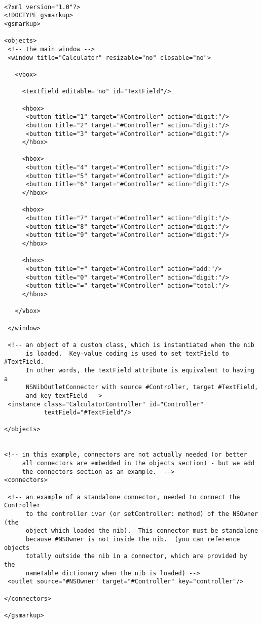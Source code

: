 \begin{verbatim}

<?xml version="1.0"?>
<!DOCTYPE gsmarkup>
<gsmarkup>

<objects>
 <!-- the main window -->
 <window title="Calculator" resizable="no" closable="no">

   <vbox>

     <textfield editable="no" id="TextField"/>

     <hbox>
      <button title="1" target="#Controller" action="digit:"/>
      <button title="2" target="#Controller" action="digit:"/>
      <button title="3" target="#Controller" action="digit:"/>
     </hbox>

     <hbox>
      <button title="4" target="#Controller" action="digit:"/>
      <button title="5" target="#Controller" action="digit:"/>
      <button title="6" target="#Controller" action="digit:"/>
     </hbox>

     <hbox>
      <button title="7" target="#Controller" action="digit:"/>
      <button title="8" target="#Controller" action="digit:"/>
      <button title="9" target="#Controller" action="digit:"/>
     </hbox>

     <hbox>
      <button title="+" target="#Controller" action="add:"/>
      <button title="0" target="#Controller" action="digit:"/>
      <button title="=" target="#Controller" action="total:"/>
     </hbox>

   </vbox>

 </window>

 <!-- an object of a custom class, which is instantiated when the nib
      is loaded.  Key-value coding is used to set textField to #TextField.
      In other words, the textField attribute is equivalent to having a
      NSNibOutletConnector with source #Controller, target #TextField, 
      and key textField -->
 <instance class="CalculatorController" id="Controller" 
           textField="#TextField"/>

</objects>


<!-- in this example, connectors are not actually needed (or better
     all connectors are embedded in the objects section) - but we add
     the connectors section as an example.  -->
<connectors>

 <!-- an example of a standalone connector, needed to connect the Controller
      to the controller ivar (or setController: method) of the NSOwner (the
      object which loaded the nib).  This connector must be standalone
      because #NSOwner is not inside the nib.  (you can reference objects
      totally outside the nib in a connector, which are provided by the
      nameTable dictionary when the nib is loaded) -->
 <outlet source="#NSOwner" target="#Controller" key="controller"/>

</connectors>

</gsmarkup>
\end{verbatim}

